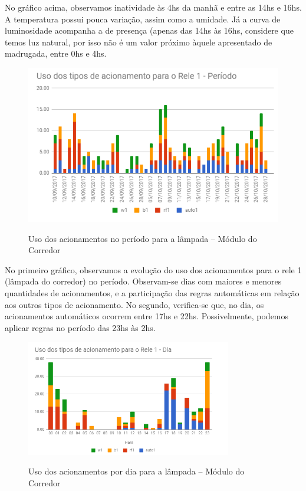 No gráfico acima, observamos inatividade às 4hs da manhã e entre as 14hs e 16hs. A temperatura possui pouca variação, assim como a umidade. Já a curva de luminosidade acompanha a de presença (apenas das 14hs às 16hs, considere que temos luz natural, por isso não é um valor próximo àquele apresentado de madrugada, entre 0hs e 4hs.

\begin{figure}[H]
	\centering
	\caption{Uso dos acionamentos no período para a lâmpada -- Módulo do Corredor}
	\includegraphics[width=1.0\textwidth]{UsoRele1periodoCorredor}
	\label{fig:UsoRele1periodoCorredor}
\end{figure}

No primeiro gráfico, observamos a evolução do uso dos acionamentos para o rele 1 (lâmpada do corredor) no período. Observam-se dias com maiores e menores quantidades de acionamentos, e a participação das regras automáticas em relação aos outros tipos de acionamento. No segundo, verifica-se que, no dia, os acionamentos automáticos ocorrem entre 17hs e 22hs. Possivelmente, podemos aplicar regras no período das 23hs às 2hs.

\begin{figure}[H]
	\centering
	\caption{Uso dos acionamentos por dia para a lâmpada -- Módulo do Corredor}
	\includegraphics[width=0.8\textwidth]{UsoRele1DiaCorredor}
	\label{fig:UsoRele1DiaCorredor}
\end{figure}

